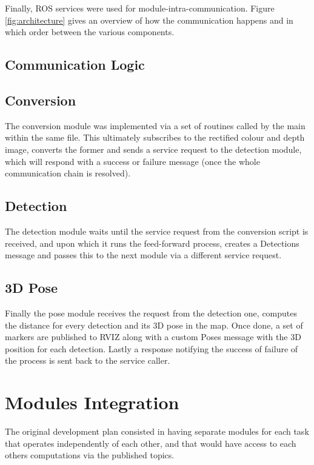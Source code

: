Finally, ROS services were used for module-intra-communication. Figure \ref{fig:architecture} gives an overview of how the communication happens and in which order between the various components.

\subsection{Communication Logic}

\subsection{Conversion}

The conversion module was implemented via a set of routines called by the main within the same file. This ultimately subscribes to the rectified colour and depth image, converts the former and sends a service request to the detection module, which will respond with a success or failure message (once the whole communication chain is resolved).

\subsection{Detection}

The detection module waits until the service request from the conversion script is received, and upon which it runs the feed-forward process, creates a Detections message and passes this to the next module via a different service request.

\subsection{3D Pose}

Finally the pose module receives the request from the detection one, computes the distance for every detection and its 3D pose in the map. Once done, a set of markers are published to RVIZ along with a custom Poses message with the 3D position for each detection. Lastly a response notifying the success of failure of the process is sent back to the service caller.

\section{Modules Integration}

The original development plan consisted in having separate modules for each task that operates independently of each other, and that would have access to each others computations via the published topics. 

